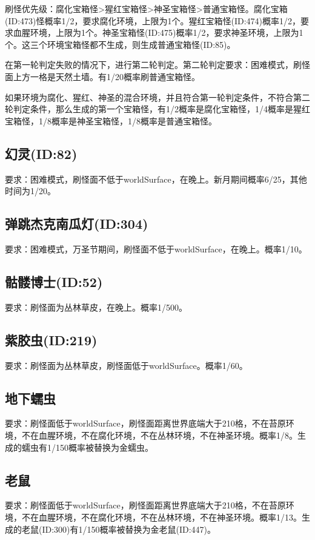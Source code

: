 刷怪优先级：腐化宝箱怪>猩红宝箱怪>神圣宝箱怪>普通宝箱怪。腐化宝箱(ID:473)怪概率1/2，要求腐化环境，上限为1个。猩红宝箱怪(ID:474)概率1/2，要求血腥环境，上限为1个。神圣宝箱怪(ID:475)概率1/2，要求神圣环境，上限为1个。这三个环境宝箱怪都不生成，则生成普通宝箱怪(ID:85)。

在第一轮判定失败的情况下，进行第二轮判定。第二轮判定要求：困难模式，刷怪面上方一格是天然土墙。有1/20概率刷普通宝箱怪。

\begin{remark}
如果环境为腐化、猩红、神圣的混合环境，并且符合第一轮判定条件，不符合第二轮判定条件，那么生成的第一个宝箱怪，有1/2概率是腐化宝箱怪，1/4概率是猩红宝箱怪，1/8概率是神圣宝箱怪，1/8概率是普通宝箱怪。
\end{remark}

\subsection{幻灵(ID:82)}
要求：困难模式，刷怪面不低于worldSurface，在晚上。新月期间概率6/25，其他时间为1/20。

\subsection{弹跳杰克南瓜灯(ID:304)}
要求：困难模式，万圣节期间，刷怪面不低于worldSurface，在晚上。概率1/10。

\subsection{骷髅博士(ID:52)}
要求：刷怪面为丛林草皮，在晚上。概率1/500。

\subsection{紫胶虫(ID:219)}
要求：刷怪面为丛林草皮，刷怪面低于worldSurface。概率1/60。

\subsection{地下蠕虫}
要求：刷怪面低于worldSurface，刷怪面距离世界底端大于210格，不在苔原环境，不在血腥环境，不在腐化环境，不在丛林环境，不在神圣环境。概率1/8。生成的蠕虫有1/150概率被替换为金蠕虫。

\subsection{老鼠}
要求：刷怪面低于worldSurface，刷怪面距离世界底端大于210格，不在苔原环境，不在血腥环境，不在腐化环境，不在丛林环境，不在神圣环境。概率1/13。生成的老鼠(ID:300)有1/150概率被替换为金老鼠(ID:447)。

